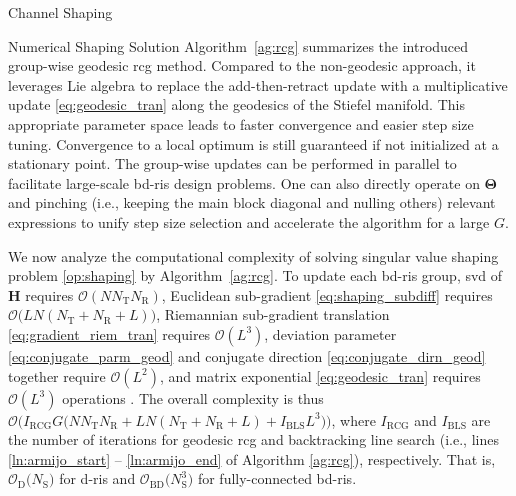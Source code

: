 \documentclass[journal]{IEEEtran}
\begin{document}
\begin{section}{Channel Shaping}
\begin{subsection}{Numerical Shaping Solution}
		Algorithm~\ref{ag:rcg} summarizes the introduced group-wise geodesic \gls{rcg} method.
		Compared to the non-geodesic approach, it leverages Lie algebra to replace the add-then-retract update with a multiplicative update \eqref{eq:geodesic_tran} along the geodesics of the Stiefel manifold.
		This appropriate parameter space leads to faster convergence and easier step size tuning.
		Convergence to a local optimum is still guaranteed if not initialized at a stationary point.
		The group-wise updates can be performed in parallel to facilitate large-scale \gls{bd}-\gls{ris} design problems.
		One can also directly operate on $\mathbf{\Theta}$ and pinching (i.e., keeping the main block diagonal and nulling others) relevant expressions to unify step size selection and accelerate the algorithm for a large $G$.

		We now analyze the computational complexity of solving singular value shaping problem \eqref{op:shaping} by Algorithm~\ref{ag:rcg}.
		To update each \gls{bd}-\gls{ris} group, \gls{svd} of $\mathbf{H}$ requires $\mathcal{O}(N N_\mathrm{T} N_\mathrm{R})$, Euclidean sub-gradient \eqref{eq:shaping_subdiff} requires $\mathcal{O}\bigl(L N (N_\mathrm{T}+N_\mathrm{R}+L) \bigr)$, Riemannian sub-gradient translation \eqref{eq:gradient_riem_tran} requires $\mathcal{O}(L^3)$, deviation parameter \eqref{eq:conjugate_parm_geod} and conjugate direction \eqref{eq:conjugate_dirn_geod} together require $\mathcal{O}(L^2)$, and matrix exponential \eqref{eq:geodesic_tran} requires $\mathcal{O}(L^3)$ operations \cite{Moler2003}.
		The overall complexity is thus $\mathcal{O}\bigl(I_\text{RCG} G \bigl(N N_\mathrm{T} N_\mathrm{R} + L N (N_\mathrm{T}+N_\mathrm{R}+L) + I_\text{BLS} L^3\bigr)\bigr)$, where $I_\text{RCG}$ and $I_\text{BLS}$ are the number of iterations for geodesic \gls{rcg} and backtracking line search (i.e., lines \ref{ln:armijo_start} -- \ref{ln:armijo_end} of Algorithm \ref{ag:rcg}), respectively.
		That is, $\mathcal{O}_\mathrm{D}\bigl(N_\mathrm{S}\bigr)$ for \gls{d}-\gls{ris} and $\mathcal{O}_\mathrm{BD}\bigl(N_\mathrm{S}^3\bigr)$ for fully-connected \gls{bd}-\gls{ris}.


\end{subsection}
\end{section}
\end{document}
